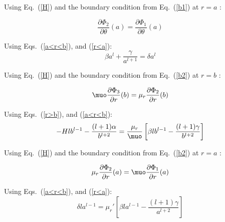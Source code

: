 Using Eq.~(\ref{H}) and the boundary condition from Eq.~(\ref{b1}) at $r=a$ :

$$\frac{\partial \Phi_2}{\partial \theta}(a)=\frac{\partial \Phi_1}{\partial \theta}(a)$$

Using Eqs.~(\ref{a<r<b}), and (\ref{r<a}):
\begin{equation}\label{e02}
\beta a^l+\frac{\gamma}{a^{l+1}}=\delta a^l
\end{equation}

Using Eq.~(\ref{H}) and the boundary condition from Eq.~(\ref{b2}) at $r=b$ :

$$\muo\frac{\partial \Phi_3}{\partial r}(b)=\mu_r\frac{\partial \Phi_2}{\partial r}(b)$$

Using Eqs.~(\ref{r>b}), and (\ref{a<r<b}):
\begin{equation}\label{e03}
-Hlb^{l-1}-\frac{(l+1)\alpha}{b^{l+2}}=\frac{\mu_r}{\muo}\left[\beta l b^{l-1}-\frac{(l+1)\gamma}{b^{l+2}}\right]
\end{equation}

Using Eq.~(\ref{H}) and the boundary condition from Eq.~(\ref{b2}) at $r=a$ :

$$\mu_r\frac{\partial \Phi_2}{\partial r}(a)=\muo\frac{\partial \Phi_1}{\partial r}(a)$$

Using Eqs.~(\ref{a<r<b}), and (\ref{r<a}):
\begin{equation}\label{e04}
\delta l a^{l-1}=\mu_r'\left[\beta l a^{l-1}-\frac{(l+1)\gamma}{a^{l+2}}\right]
\end{equation}




